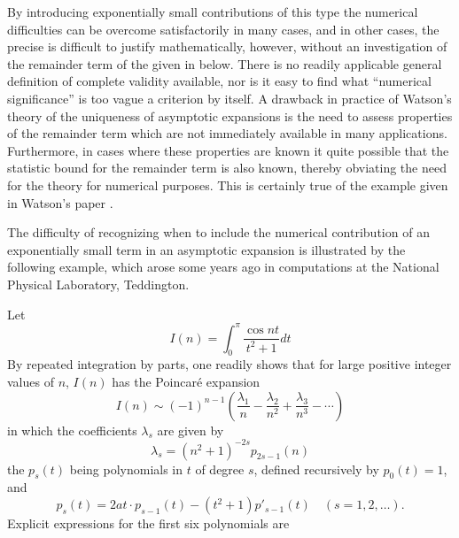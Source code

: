 \documentclass{article}
\begin{document}
By introducing exponentially small contributions of this type the numerical
difficulties can be overcome satisfactorily in many cases, and in other cases,
the precise is difficult to justify mathematically, however, without an
investigation of the remainder term of the given in {\cite{watson_reference}}
below. There is no readily applicable general definition of complete validity
available, nor is it easy to find what ``numerical significance'' is too vague
a criterion by itself. A drawback in practice of Watson's theory of the
uniqueness of asymptotic expansions {\cite{watson_uniqueness}} is the need to
assess properties of the remainder term which are not immediately available in
many applications. Furthermore, in cases where these properties are known it
quite possible that the statistic bound for the remainder term is also known,
thereby obviating the need for the theory for numerical purposes. This is
certainly true of the example given in Watson's paper {\cite{watson_paper}}.

The difficulty of recognizing when to include the numerical contribution of an
exponentially small term in an asymptotic expansion is illustrated by the
following example, which arose some years ago in computations at the National
Physical Laboratory, Teddington.

Let
\begin{equation}
  \label{eq:integral_example} I (n) = \int_0^{\pi} \frac{\cos nt}{t^2 + 1} dt
\end{equation}
By repeated integration by parts, one readily shows that for large positive
integer values of $n$, $I (n)$ has the Poincar{\'e} expansion
\begin{equation}
  \label{eq:poincare_expansion} I (n) \sim (- 1)^{n - 1}  \left(
  \frac{\lambda_1}{n} - \frac{\lambda_2}{n^2} + \frac{\lambda_3}{n^3} - \cdots
  \right)
\end{equation}
in which the coefficients $\lambda_s$ are given by
\begin{equation}
  \label{eq:lambda_coefficients} \lambda_s = (n^2 + 1)^{- 2 s} p_{2 s - 1} (n)
\end{equation}
the $p_s (t)$ being polynomials in $t$ of degree $s$, defined recursively by
$p_0 (t) = 1$, and
\begin{equation}
  \label{eq:recursive_polynomials} p_s (t) = 2 at \cdot p_{s - 1} (t) - (t^2 +
  1) p'_{s - 1} (t) \quad (s = 1, 2, \ldots) .
\end{equation}
Explicit expressions for the first six polynomials are
\end{document}
